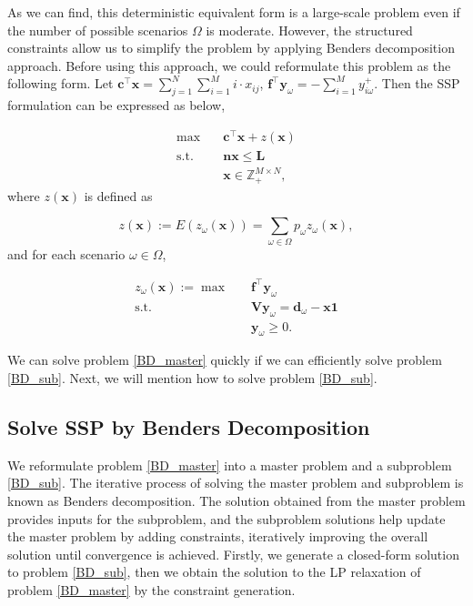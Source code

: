 As we can find, this deterministic equivalent form is a large-scale problem even if the number of possible scenarios $\Omega$ is moderate. However, the structured constraints allow us to simplify the problem by applying Benders decomposition approach. Before using this approach, we could reformulate this problem as the following form. Let $\mathbf{c}^{\intercal}\mathbf{x} = \sum_{j =1}^{N} \sum_{i=1}^M i \cdot x_{ij}$, $\mathbf{f}^{\intercal}\mathbf{y}_{\omega} = -\sum_{i=1}^{M} y_{i \omega}^{+}$. Then the SSP formulation can be expressed as below,

\begin{equation}\label{BD_master}
\begin{aligned}
\max \quad & \mathbf{c}^{\intercal} \mathbf{x}+ z(\mathbf{x}) \\
\text {s.t.} \quad & \mathbf{n} \mathbf{x} \leq \mathbf{L} \\
& \mathbf{x} \in \mathbb{Z}_{+}^{M \times N},
\end{aligned}
\end{equation}
where $z(\mathbf{x})$ is defined as

$$z(\mathbf{x}) := E(z_{\omega}(\mathbf{x})) = \sum_{\omega \in \Omega} p_{\omega} z_{\omega}(\mathbf{x}),$$ and for each scenario $\omega \in \Omega$, 

\begin{equation}\label{BD_sub}
  \begin{aligned}
    z_{\omega}(\mathbf{x}) := \max \quad & \mathbf{f}^{\intercal} \mathbf{y}_{\omega} \\
    \text {s.t.} \quad & \mathbf{V} \mathbf{y}_{\omega} = \mathbf{d}_{\omega} - \mathbf{x} \mathbf{1} \\
     & \mathbf{y}_{\omega} \geq 0.
  \end{aligned}
\end{equation}


We can solve problem \eqref{BD_master} quickly if we can efficiently solve problem \eqref{BD_sub}. Next, we will mention how to solve problem \eqref{BD_sub}.

\subsection{Solve SSP by Benders Decomposition}\label{solve_by_benders}
We reformulate problem \eqref{BD_master} into a master problem and a subproblem \eqref{BD_sub}. The iterative process of solving the master problem and subproblem is known as Benders decomposition. 
The solution obtained from the master problem provides inputs for the subproblem, and the subproblem solutions help update the master problem by adding constraints, iteratively improving the overall solution until convergence is achieved. Firstly, we generate a closed-form solution to problem \eqref{BD_sub}, then we obtain the solution to the LP relaxation of problem \eqref{BD_master} by the constraint generation.

